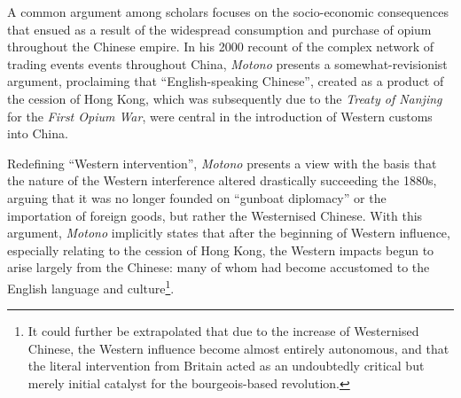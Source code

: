\documentclass[a4paper,oneside]{article}
\begin{document}
A common argument among scholars focuses on the socio-economic consequences that
ensued as a result of the widespread consumption and purchase of opium
throughout the Chinese empire. In his 2000 recount of the complex network of
trading events events throughout China, \textit{Motono} presents a
somewhat-revisionist argument, proclaiming that ``English-speaking Chinese'',
created as a product of the cession of Hong Kong, which was subsequently due to
the \textit{Treaty of Nanjing} for the \textit{First Opium War}, were central in
the introduction of Western customs into China.

Redefining ``Western intervention'', \textit{Motono} presents a view with the
basis that the nature of the Western interference altered drastically succeeding
the 1880s, arguing that it was no longer founded on ``gunboat diplomacy'' or the
importation of foreign goods, but rather the Westernised Chinese. With this
argument, \textit{Motono} implicitly states that after the beginning of Western
influence, especially relating to the cession of Hong Kong, the Western impacts
begun to arise largely from the Chinese: many of whom had become accustomed to
the English language and culture\footnote{It could further be extrapolated that
due to the increase of Westernised Chinese, the Western influence become almost
entirely autonomous, and that the literal intervention from Britain acted as an
undoubtedly critical but merely initial catalyst for the bourgeois-based
revolution.}.

\end{document}
